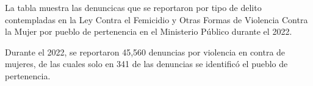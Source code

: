 La tabla muestra las denuncicas que se reportaron por tipo de delito contempladas en la Ley Contra el Femicidio y Otras Formas de Violencia Contra la Mujer por pueblo de pertenencia en el Ministerio Público durante el 2022. 

Durante el 2022, se reportaron 45,560 denuncias por violencia en contra de mujeres, de las cuales solo en 341 de las denuncias se identificó el pueblo de pertenencia.
